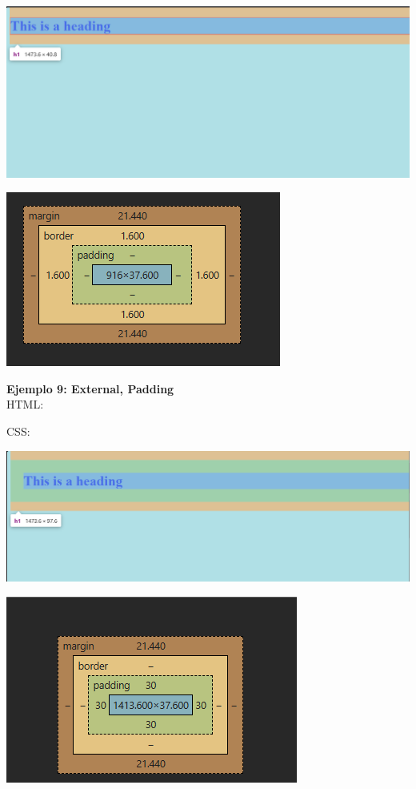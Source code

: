 \documentclass[11pt]{scrartcl}
\begin{document}
\begin{center}
    \includegraphics[scale=0.4]{Ex8.png}
\end{center}
\begin{center}
    \includegraphics[scale=0.8]{Ex8bord.png}
\end{center}


\textbf{Ejemplo 9: External, Padding} \\

HTML:




CSS:



\begin{center}
    \includegraphics[scale=0.4]{Ex9.png}
\end{center}
\begin{center}
    \includegraphics[scale=0.8]{Ex9bord.png}
\end{center}
\end{document}
